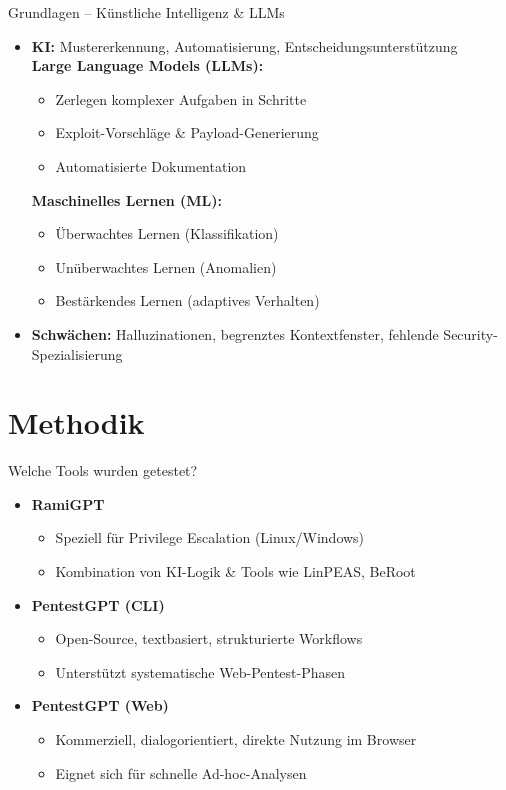 \documentclass[
	aspectratio=169,	%
	onlytextwidth,		%
	t,					%
	]{beamer}
\begin{document}
\begin{frame}{Grundlagen – Künstliche Intelligenz \& LLMs}
	\begin{itemize}
		\item \textbf{KI:} Mustererkennung, Automatisierung, Entscheidungsunterstützung \\
	    \textbf{Large Language Models (LLMs):}
		\begin{itemize}
			\item Zerlegen komplexer Aufgaben in Schritte
			\item Exploit-Vorschläge \& Payload-Generierung
			\item Automatisierte Dokumentation
		\end{itemize}
	    \textbf{Maschinelles Lernen (ML):}
		\begin{itemize}
			\item Überwachtes Lernen (Klassifikation)
			\item Unüberwachtes Lernen (Anomalien)
			\item Bestärkendes Lernen (adaptives Verhalten)
		\end{itemize}
		\item \textbf{Schwächen:} Halluzinationen, begrenztes Kontextfenster, fehlende Security-Spezialisierung
	\end{itemize}
\end{frame}

\section{Methodik}
\begin{frame}{Welche Tools wurden getestet?}
	\begin{itemize}
		\item \textbf{RamiGPT}
		\begin{itemize}
			\item Speziell für Privilege Escalation (Linux/Windows)
			\item Kombination von KI-Logik \& Tools wie LinPEAS, BeRoot
		\end{itemize}
		
		\item \textbf{PentestGPT (CLI)}
		\begin{itemize}
			\item Open-Source, textbasiert, strukturierte Workflows
			\item Unterstützt systematische Web-Pentest-Phasen
		\end{itemize}
		
		\item \textbf{PentestGPT (Web)}
		\begin{itemize}
			\item Kommerziell, dialogorientiert, direkte Nutzung im Browser
			\item Eignet sich für schnelle Ad-hoc-Analysen
		\end{itemize}
	\end{itemize}
\end{frame}
\end{document}
